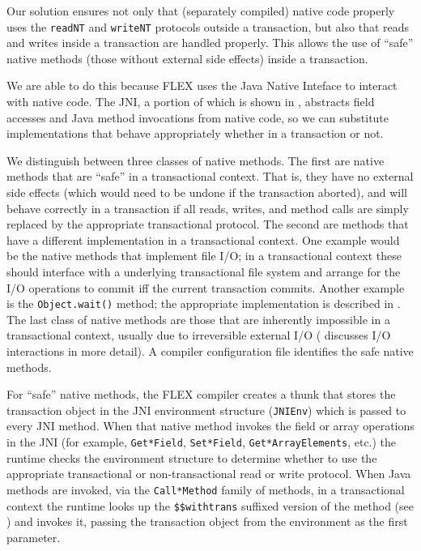Our solution ensures not only that (separately compiled) native code
properly uses the \texttt{readNT} and  \texttt{writeNT} protocols
outside a transaction, but also that reads and writes inside a
transaction are handled properly.  This allows the use of ``safe''
native methods (those without external side effects) inside a
transaction. 

We are able to do this because FLEX uses the Java Native Inteface
\cite{JNI} to interact with native code.  The JNI, a portion of which
is shown in , abstracts field
accesses and Java method invocations from native code, so we can
substitute implementations that behave appropriately whether in a
transaction or not.

We distinguish between three classes of native methods.  The first are
native methods that are ``safe'' in a transactional context.  That
is, they have no external side effects (which would need to be undone
if the transaction aborted), and will behave correctly in a
transaction if all reads, writes, and method calls are simply replaced
by the appropriate transactional protocol.   The second are methods
that have a different implementation in a transactional context. One
example would be the native methods that implement file I/O; in a
transactional context these should interface with a underlying
transactional file system and arrange for the I/O operations to commit
iff the current transaction commits.  Another example is the
\texttt{Object.wait()} method; the appropriate implementation is
described in .   The last class of native methods
are those that are inherently impossible in a transactional context,
usually due to irreversible external I/O ( discusses I/O
interactions in more detail).  A compiler configuration file
identifies the safe native methods.

For ``safe'' native methods, the FLEX compiler creates a thunk that
stores the transaction object in the JNI environment structure
(\texttt{JNIEnv}) which is passed to every JNI method.  When that
native method invokes the field or array operations in the JNI (for
example, \texttt{Get*Field}, \texttt{Set*Field}, \texttt{Get*ArrayElements},
etc.) the runtime checks the environment structure to
determine whether to use the appropriate transactional or
non-transactional read or write protocol.  When Java methods are
invoked, via the \texttt{Call*Method} family of methods, in a
transactional context the runtime looks up the \texttt{\$\$withtrans}
suffixed version of the method (see ) and invokes
it, passing the transaction object from the environment as the first
parameter.

